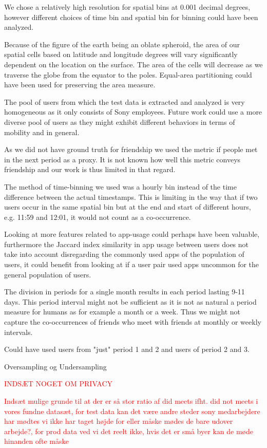 We chose a relatively high resolution for spatial bins at 0.001 decimal degrees, however different choices of time bin and spatial bin for binning could have been analyzed.

Because of the figure of the earth being an oblate spheroid, the area of our spatial cells based on latitude and longitude degrees will vary significantly dependent on the location on the surface. The area of the cells will decrease as we traverse the globe from the equator to the poles. Equal-area partitioning could have been used for preserving the area measure.

The pool of users from which the test data is extracted and analyzed is very homogeneous as it only consists of Sony employees. Future work could use a more diverse pool of users as they might exhibit different behaviors in terms of mobility and in general.

As we did not have ground truth for friendship we used the metric if people met in the next period as a proxy. It is not known how well this metric conveys friendship and our work is thus limited in that regard.

The method of time-binning we used was a hourly bin instead of the time difference between the actual timestamps. This is limiting in the way that if two users occur in the same spatial bin but at the end and start of different hours, e.g. 11:59 and 12:01, it would not count as a co-occurrence.

Looking at more features related to app-usage could perhaps have been valuable, furthermore the Jaccard index similarity in app usage between users does not take into account disregarding the commonly used apps of the population of users, it could benefit from looking at if a user pair used apps uncommon for the general population of users.

The division in periods for a single month results in each period lasting 9-11 days. This period interval might not be sufficient as it is not as natural a period measure for humans as for example a month or a week. Thus we might not capture the co-occurrences of friends who meet with friends at monthly or weekly intervals.

Could have used users from "just" period 1 and 2 and users of period 2 and 3.

Oversampling og Undersampling

\textcolor{red}{INDSÆT NOGET OM PRIVACY}

\textcolor{red}{Indsæt mulige grunde til at der er så stor ratio af did meets ifht. did not meets i vores fundne datasæt, for test data kan det være andre steder sony medarbejdere har mødtes vi ikke har taget højde for eller måske mødes de bare udover arbejde?, for prod data ved vi det reelt ikke, hvis det er små byer kan de møde hinanden ofte måske}


